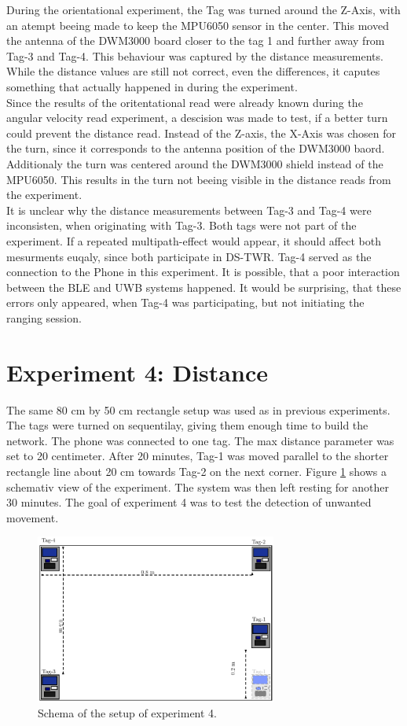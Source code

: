 During the orientational experiment, the Tag was turned around the Z-Axis, with an atempt beeing made to keep the MPU6050 sensor in the center.
This moved the antenna of the DWM3000 board closer to the tag 1 and further away from Tag-3 and Tag-4.
This behaviour was captured by the distance measurements.
While the distance values are still not correct, even the differences, it caputes something that actually happened in during the experiment.\\
Since the results of the oritentational read were already known during the angular velocity read experiment, a descision was made to test, if a better turn could prevent the distance read.
Instead of the Z-axis, the X-Axis was chosen for the turn, since it corresponds to the antenna position of the DWM3000 baord.
Additionaly the turn was centered around the DWM3000 shield instead of the MPU6050.
This results in the turn not beeing visible in the distance reads from the experiment.\\
It is unclear why the distance measurements between Tag-3 and Tag-4 were inconsisten, when originating with Tag-3. 
Both tags were not part of the experiment.
If a repeated multipath-effect would appear, it should affect both mesurments euqaly, since both participate in DS-TWR.
Tag-4 served as the connection to the Phone in this experiment.
It is possible, that a poor interaction between the BLE and UWB systems happened.
It would be surprising, that these errors only appeared, when Tag-4 was participating, but not initiating the ranging session.


\section{Experiment 4: Distance}
\label{ss:exp_4}
The same 80 cm by 50 cm rectangle setup was used as in previous experiments.
The tags were turned on sequentilay, giving them enough time to build the network.
The phone was connected to one tag.
The max distance parameter was set to 20 centimeter.
After 20 minutes, Tag-1 was moved parallel to the shorter rectangle line about 20 cm towards Tag-2 on the next corner.
Figure \ref{f:exp4_schematic} shows a schemativ view of the experiment.
The system was then left resting for another 30 minutes.
The goal of experiment 4 was to test the detection of unwanted movement.


\begin{figure}[ht!]
	\centering
	\includegraphics[width=300px]{graphics/schematics/experiment_4.pdf}
	\caption{Schema of the setup of experiment 4.}
	\label{f:exp4_schematic}
\end{figure}

